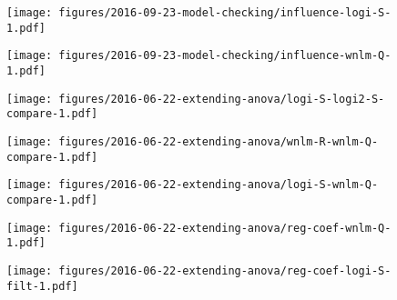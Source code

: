 \documentclass[letterpaper]{article}
\begin{document}
\begin{figure}
\begin{center}
\texttt{[image: figures/2016-09-23-model-checking/influence-logi-S-1.pdf]}
\end{center}
\caption{}
\label{fig:influence-logi.S}
\end{figure}

\begin{figure}
\begin{center}
\texttt{[image: figures/2016-09-23-model-checking/influence-wnlm-Q-1.pdf]}
\end{center}
\caption{}
\label{fig:influence-wnlm.Q}
\end{figure}

\begin{figure}
\begin{center}
\texttt{[image: figures/2016-06-22-extending-anova/logi-S-logi2-S-compare-1.pdf]}
\end{center}
\caption{}
\label{fig:logi.S-logi2.S-compare}
\end{figure}

\begin{figure}
\begin{center}
\texttt{[image: figures/2016-06-22-extending-anova/wnlm-R-wnlm-Q-compare-1.pdf]}
\end{center}
\caption{}
\label{fig:wnlm.R-wnlm.Q-compare}
\end{figure}

\begin{figure}
\begin{center}
\texttt{[image: figures/2016-06-22-extending-anova/logi-S-wnlm-Q-compare-1.pdf]}
\end{center}
\caption{}
\label{fig:logi.S-wnlm.Q-compare}
\end{figure}

\begin{figure}
\begin{center}
\texttt{[image: figures/2016-06-22-extending-anova/reg-coef-wnlm-Q-1.pdf]}
\end{center}
\caption{}
\label{fig:all-effects-wnlm.Q}
\end{figure}

\begin{figure}
\begin{center}
\texttt{[image: figures/2016-06-22-extending-anova/reg-coef-logi-S-filt-1.pdf]}
\end{center}
\caption{}
\label{fig:all-effects-logi.S}
\end{figure}
\end{document}
